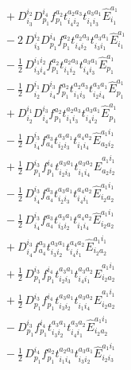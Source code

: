 \documentclass[11pt]{article}
\begin{document}
\begin{align}
&\quad + D^{i_{2}}_{i_{3}} D^{i_{4}}_{p_{1}} f^{a_{2}}_{p_{1}} t^{a_{2}a_{3}}_{i_{4}i_{2}} t^{a_{3}a_{1}}_{i_{1}i_{3}} \hat{E}^{a_{1}}_{i_{1}} \\
&\quad - 2\, D^{i_{2}}_{i_{3}} D^{i_{4}}_{p_{1}} f^{a_{2}}_{p_{1}} t^{a_{2}a_{3}}_{i_{4}i_{2}} t^{a_{3}a_{1}}_{i_{3}i_{1}} \hat{E}^{a_{1}}_{i_{1}} \\
&\quad - \tfrac{1}{2}\, D^{i_{1}i_{2}}_{i_{3}i_{4}} f^{a_{2}}_{p_{1}} t^{a_{2}a_{3}}_{i_{1}i_{2}} t^{a_{3}a_{1}}_{i_{4}i_{3}} \hat{E}^{a_{1}}_{p_{1}} \\
&\quad - \tfrac{1}{2}\, D^{i_{1}}_{i_{2}} D^{i_{3}}_{i_{4}} f^{a_{2}}_{p_{1}} t^{a_{2}a_{3}}_{i_{1}i_{3}} t^{a_{3}a_{1}}_{i_{2}i_{4}} \hat{E}^{a_{1}}_{p_{1}} \\
&\quad + D^{i_{1}}_{i_{2}} D^{i_{3}}_{i_{4}} f^{a_{2}}_{p_{1}} t^{a_{2}a_{3}}_{i_{1}i_{3}} t^{a_{3}a_{1}}_{i_{4}i_{2}} \hat{E}^{a_{1}}_{p_{1}} \\
&\quad - \tfrac{1}{2}\, D^{i_{3}}_{i_{4}} f^{a_{3}}_{a_{4}} t^{a_{3}a_{1}}_{i_{2}i_{3}} t^{a_{4}a_{2}}_{i_{1}i_{4}} \hat{E}^{a_{1}i_{1}}_{a_{2}i_{2}} \\
&\quad + \tfrac{1}{2}\, D^{i_{3}}_{p_{1}} f^{i_{4}}_{p_{1}} t^{a_{3}a_{1}}_{i_{2}i_{3}} t^{a_{3}a_{2}}_{i_{1}i_{4}} \hat{E}^{a_{1}i_{1}}_{a_{2}i_{2}} \\
&\quad - \tfrac{1}{2}\, D^{i_{3}}_{i_{4}} f^{a_{3}}_{a_{4}} t^{a_{3}a_{1}}_{i_{2}i_{3}} t^{a_{4}a_{2}}_{i_{4}i_{1}} \hat{E}^{a_{1}i_{1}}_{i_{2}a_{2}} \\
&\quad - \tfrac{1}{2}\, D^{i_{3}}_{i_{4}} f^{a_{3}}_{a_{4}} t^{a_{3}a_{1}}_{i_{3}i_{2}} t^{a_{4}a_{2}}_{i_{1}i_{4}} \hat{E}^{a_{1}i_{1}}_{i_{2}a_{2}} \\
&\quad + D^{i_{3}}_{i_{4}} f^{a_{3}}_{a_{4}} t^{a_{3}a_{1}}_{i_{3}i_{2}} t^{a_{4}a_{2}}_{i_{4}i_{1}} \hat{E}^{a_{1}i_{1}}_{i_{2}a_{2}} \\
&\quad + \tfrac{1}{2}\, D^{i_{3}}_{p_{1}} f^{i_{4}}_{p_{1}} t^{a_{3}a_{1}}_{i_{2}i_{3}} t^{a_{3}a_{2}}_{i_{4}i_{1}} \hat{E}^{a_{1}i_{1}}_{i_{2}a_{2}} \\
&\quad + \tfrac{1}{2}\, D^{i_{3}}_{p_{1}} f^{i_{4}}_{p_{1}} t^{a_{3}a_{1}}_{i_{3}i_{2}} t^{a_{3}a_{2}}_{i_{1}i_{4}} \hat{E}^{a_{1}i_{1}}_{i_{2}a_{2}} \\
&\quad - D^{i_{3}}_{p_{1}} f^{i_{4}}_{p_{1}} t^{a_{3}a_{1}}_{i_{3}i_{2}} t^{a_{3}a_{2}}_{i_{4}i_{1}} \hat{E}^{a_{1}i_{1}}_{i_{2}a_{2}} \\
&\quad - \tfrac{1}{2}\, D^{i_{4}}_{p_{1}} f^{a_{2}}_{p_{1}} t^{a_{2}a_{3}}_{i_{1}i_{4}} t^{a_{3}a_{1}}_{i_{3}i_{2}} \hat{E}^{a_{1}i_{1}}_{i_{2}i_{3}} \\

\end{align}
\end{document}
